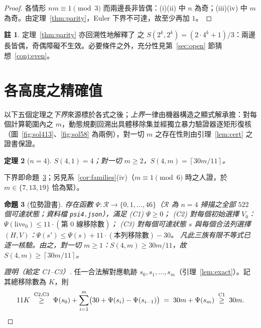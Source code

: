 \documentclass[11pt]{ctexart}
\newtheorem{theorem}{定理}[section]
\newtheorem{proposition}[theorem]{命題}
\theoremstyle{definition}
\newtheorem{remark}[theorem]{註}
\newcommand{\ceil}[1]{\left\lceil #1 \right\rceil}
\begin{document}
\begin{proof}
各情形 $nm\equiv1\pmod3$ 而兩邊長非皆偶：(i)(ii) 中 $n$ 為奇；(iii)(iv) 中 $m$ 為奇。由定理~\ref{thm:parity}，Euler 下界不可達，故至少再加 $1$。
\end{proof}

\begin{remark}
定理~\ref{thm:parity} 亦回溯性地解釋了 \cite{NT25,Golomb54} 之 $S(2^k,2^k)=(2\cdot4^k+1)/3$：兩邊長皆偶，奇偶障礙不生效。必要條件之外，充分性見第~\ref{sec:open} 節猜想~\ref{conj:even}。
\end{remark}

\section{各高度之精確值}\label{sec:exact}

以下五個定理之\emph{下界}來源標於各式之後；\emph{上界}一律由機器構造之顯式解承擔：對每個計算範圍內之 $m$，動態規劃回溯出具體移除集並經獨立暴力驗證器逐矩形復核（圖~\ref{fig:sol413}、\ref{fig:sol58} 為兩例），對一切 $m$ 之存在性則由引理~\ref{lem:cert} 之證書保證。

\begin{theorem}[$n=4$]\label{thm:n4}
$S(4,1)=4$；對一切 $m\ge2$，$S(4,m)=\ceil{30m/11}$。
\end{theorem}

下界即命題~\ref{prop:psi}；另見系~\ref{cor:families}(iv)（$m\equiv1\pmod6$ 時之人證，於 $m\in\{7,13,19\}$ 恰為緊）。

\begin{proposition}[位勢證書]\label{prop:psi}
存在函數 $\Psi:\mathcal R\to\{0,1,\dots,46\}$（$\mathcal R$ 為 $n=4$ 掃描之全部 $522$ 個可達狀態；資料檔 \texttt{psi4.json}），滿足
\emph{(C1)} $\Psi\ge0$；
\emph{(C2)} 對每個初始選擇 $V_0$：$\Psi(\mathrm{live}_0)\le 11\cdot(\text{第 }0\text{ 線移除數})$；
\emph{(C3)} 對每個可達狀態 $s$ 與每個合法列選擇 $(H,V)$：$\Psi(s')\le\Psi(s)+11\cdot(\text{本列移除數})-30$。
凡此三族有限不等式已逐一核驗。由之，對一切 $m\ge1$：$S(4,m)\ge 30m/11$，故 $S(4,m)\ge\ceil{30m/11}$。
\end{proposition}

\begin{proof}[證明（給定 C1--C3）]
任一合法解對應軌跡 $s_0,s_1,\dots,s_m$（引理~\ref{lem:exact}）。記其總移除數為 $K$，則
\[
11K\;\overset{\text{C2,C3}}{\ge}\;\Psi(s_0)+\sum_{i=1}^{m}\bigl(30+\Psi(s_i)-\Psi(s_{i-1})\bigr)\;=\;30m+\Psi(s_m)\;\overset{\text{C1}}{\ge}\;30m. \qedhere
\]
\end{proof}
\end{document}
